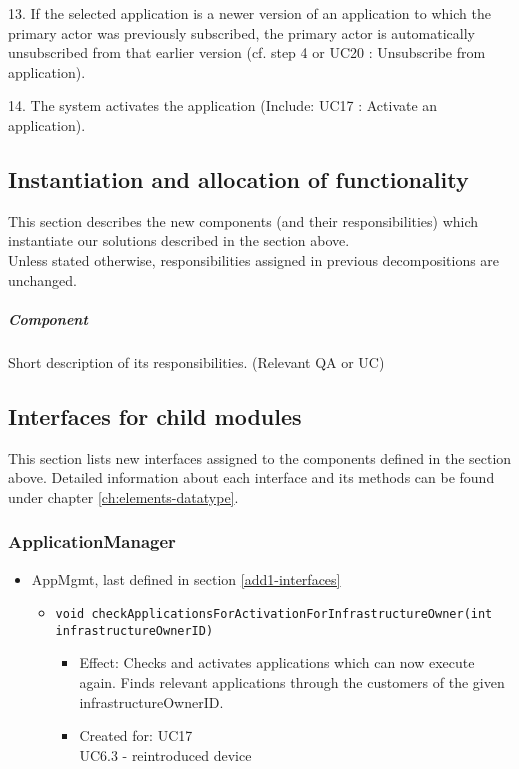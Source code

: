 {{{            13. If the selected application is a newer version of an application to which the primary actor was previously subscribed,
                the primary actor is automatically unsubscribed from that earlier version (cf. step 4 or UC20 : Unsubscribe from application).

            14. The system activates the application (Include: UC17 : Activate an application).


\subsection{Instantiation and allocation of functionality}
    This section describes the new components (and their responsibilities)
    which instantiate our solutions described in the section above. \\
    Unless stated otherwise, responsibilities assigned in previous decompositions are unchanged.

    \subparagraph{Component}
        Short description of its responsibilities. (Relevant QA or UC)


\subsection{Interfaces for child modules}
    This section lists new interfaces assigned to the components defined
    in the section above. Detailed information about each interface and
    its methods can be found under chapter \ref{ch:elements-datatype}. \\

    \subsubsection{ApplicationManager}
        \begin{itemize}
            \item AppMgmt, last defined in section \ref{add1-interfaces}
                \begin{itemize}
                    \item \texttt{void checkApplicationsForActivationForInfrastructureOwner(int infrastructureOwnerID)}
                        \begin{itemize}
                			\item Effect: Checks and activates applications which can now execute again. Finds relevant applications through the customers of the given infrastructureOwnerID.
                			\item Created for: UC17 \\ UC6.3 - reintroduced device
                        \end{itemize}
                \end{itemize}


\end{itemize}}}}
